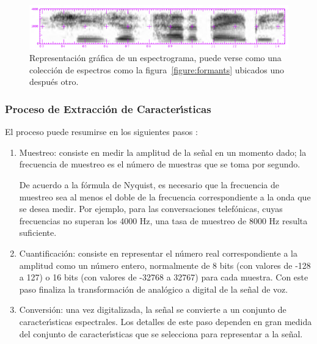 \begin{figure}[H]
\centering
\includegraphics[width=0.9\linewidth]{./graphics/spectrogram.png}
\caption{Representaci\'on gr\'afica de un espectrograma, puede verse como una colecci\'on de espectros como la 
    figura~\ref{figure:formants} ubicados uno despu\'es otro.}
\label{figure:spectrogram}
\end{figure}

\subsubsection{Proceso de Extracci\'on de Caracter{\'\i}sticas}
El proceso puede resumirse en los siguientes pasos \cite{Jurafsky}:

\begin{enumerate}
\item Muestreo: consiste en medir la amplitud de la se\~nal en un momento dado; la frecuencia de muestreo es el 
n\'umero de muestras que se toma por segundo. 

De acuerdo a la f\'ormula de Nyquist, es necesario que la frecuencia de muestreo sea al menos el doble de la frecuencia 
correspondiente a la onda que se desea medir. Por ejemplo, para las conversaciones telef\'onicas, cuyas frecuencias no 
superan los 4000 Hz, una tasa de muestreo de 8000 Hz resulta suficiente.

\item Cuantificaci\'on: consiste en representar el n\'umero real correspondiente a la amplitud 
como un n\'umero entero, normalmente de 8 bits (con valores de -128 a 127) o 16 bits (con valores de -32768 a 32767) para cada muestra. 
Con este paso finaliza la transformaci\'on de anal\'ogico a digital de la se\~nal de voz.

\item Conversi\'on: una vez digitalizada, la se\~nal se convierte a un conjunto de caracter{\'\i}sticas espectrales. Los detalles de este 
paso dependen en gran medida del conjunto de caracter{\'\i}sticas que se selecciona para representar a la se\~nal.

\end{enumerate}

